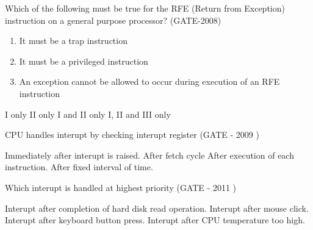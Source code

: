 \begin{questyle}
  \question  Which of the following must be true for the RFE (Return from Exception) instruction
             on a general purpose processor?  (GATE-2008)

             \begin{enumerate}
                  \item It must be a trap instruction
                  \item It must be a privileged instruction
                  \item An exception cannot be allowed to occur during execution of an RFE instruction
              \end{enumerate}

  \begin{oneparchoices}
    \choice         I only
    \choice         II only
    \choice         I and II only
    \CorrectChoice  I, II and III only
  \end{oneparchoices}
\end{questyle}




\begin{questyle}

  \question CPU handles interupt by checking interupt register (GATE - 2009 )

  \begin{choices}
    \choice Immediately after interupt is raised.
    \choice After fetch cycle
    \CorrectChoice After execution of each instruction.
    \choice After fixed interval of time.
  \end{choices}

  \end{questyle}




\begin{questyle}

  \question Which interupt is handled at highest priority (GATE - 2011 )

  \begin{choices}
    \choice Interupt after completion of hard disk read operation.
    \choice Interupt after mouse click.
    \choice Interupt after keyboard button press.
    \CorrectChoice Interupt after CPU temperature too high.
  \end{choices}

  \end{questyle}




